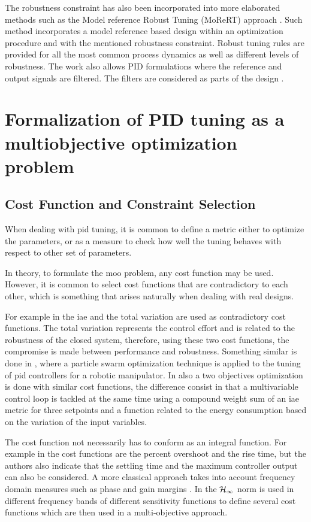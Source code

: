 The robustness constraint has also been incorporated into more elaborated  methods such as the Model reference Robust Tuning (MoReRT) approach \citep{alfarojopc22}. Such method incorporates a model reference based design within an optimization procedure and with the mentioned robustness constraint. Robust tuning rules are provided for all the most common process dynamics as well as different levels of robustness. The work also allows PID formulations where the reference and output signals are filtered. The filters are considered as parts of the design \citep{alfaroiechr2013}.
%
%
\section{Formalization of PID tuning as a multiobjective optimization problem}
\label{sec:FormPIDMOOP}
\subsection{Cost Function and Constraint Selection}
\label{sec:CostFunSelec}
When dealing with \gls{pid} tuning, it is common to define a metric either to optimize the parameters, or as a measure to check how well the tuning behaves with respect to other set of parameters.

In theory, to formulate the \gls{moo} problem, any cost function may be used. However, it is common to select cost functions that are contradictory to each other, which is something that arises naturally when dealing with real designs.

For example in \citet{SabinaSanchez2017} the \gls{iae} and the total variation are used as contradictory cost functions. The total variation represents the control effort and is related to the robustness of the closed system, therefore, using these two cost functions, the compromise is made between performance and robustness. Something similar is done in \citet{Pierezan2014}, where a particle swarm optimization technique is applied to the tuning of \gls{pid} controllers for a robotic manipulator. In \citet{Zhou2018} also a two objectives optimization is done with similar cost functions, the difference consist in that a multivariable control loop is tackled at the same time using a compound weight sum of an \gls{iae} metric for three setpoints and a function related to the energy consumption based on the variation of the input variables.

The cost function not necessarily has to conform as an integral function. For example in \citet{Abbas1995} the cost functions are the percent overshoot  and the rise time, but the authors also indicate that the settling time and the maximum controller output can also be considered. A more classical approach takes into account frequency domain measures such as phase and gain margins \citep{astromhagglun84,hoetal95}. In \citet{Huang2008a} the $\cal{ H}_\infty$ norm is used in different frequency bands of different sensitivity functions to define several cost functions which are then used in a multi-objective approach.

